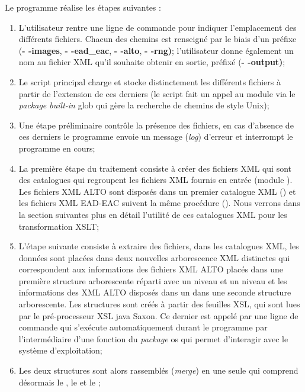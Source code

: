 Le programme réalise les étapes suivantes :
\begin{enumerate}
    \item L'utilisateur rentre une ligne de commande pour indiquer l'emplacement des différents fichiers. Chacun des chemins est renseigné par le biais d'un préfixe (\textbf{- -images}, \textbf{- -ead\_eac}, \textbf{- -alto}, \textbf{- -rng)}; l'utilisateur donne également un nom au fichier XML qu'il souhaite obtenir en sortie, préfixé (\textbf{- -output)};
    \item Le script principal charge et stocke distinctement les différents fichiers à partir de l'extension de ces derniers (le script fait un appel au module  via le \textit{package built-in} glob qui gère la recherche de chemins de style Unix);
    \item Une étape préliminaire contrôle la présence des fichiers, en cas d'absence de ces derniers le programme envoie un message (\textit{log}) d'erreur et interrompt le programme en cours;
    \item La première étape du traitement consiste à créer des fichiers XML qui sont des catalogues qui regroupent les fichiers XML fournis en entrée (module ). Les fichiers XML ALTO sont disposés dans un premier catalogue XML () et les fichiers XML EAD-EAC suivent la même procédure (). Nous verrons dans la section suivantes plus en détail l'utilité de ces catalogues XML pour les transformation XSLT;
    \item L'étape suivante consiste à extraire des fichiers, dans les catalogues XML, les données sont placées dans deux nouvelles arborescence XML distinctes qui correspondent aux informations des fichiers XML ALTO placés dans une première structure arborescente réparti avec un niveau  et un niveau  et les informations des XML ALTO disposés dans un  dans une seconde structure arborescente. Les structures sont créés à partir des feuilles XSL, qui sont lues par le pré-processeur XSL java Saxon. Ce dernier est appelé par une ligne de commande qui s'exécute automatiquement durant le programme par l'intermédiaire d'une fonction du \textit{package} os qui permet d'interagir avec le système d'exploitation;
    \item Les deux structures sont alors rassemblés (\textit{merge}) en une seule qui comprend désormais le , le  et le ;

\end{enumerate}
